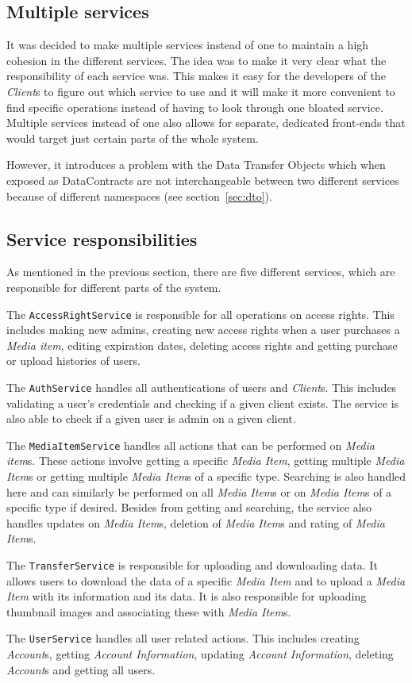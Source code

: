 \documentclass[../report.tex]{subfiles}
\begin{document}
\subsection{Multiple services}
It was decided to make multiple services instead of one to maintain a high cohesion in the different services.
The idea was to make it very clear what the responsibility of each service was. 
This makes it easy for the developers of the \textit{Client}s to figure out which service to use and it will make it more convenient to find specific operations instead of having to look through one bloated service.
Multiple services instead of one also allows for separate, dedicated front-ends that would target just certain parts of the whole system. 

However, it introduces a problem with the Data Transfer Objects which when exposed as DataContracts are not interchangeable between two different services because of different namespaces (see section~\ref{sec:dto}).

\subsection{Service responsibilities}
As mentioned in the previous section, there are five different services, which are responsible for different parts of the system. 

The \texttt{AccessRightService} is responsible for all operations on access rights. This includes making new admins, creating new access rights when a user purchases a \textit{Media item}, editing expiration dates, deleting access rights and getting purchase or upload histories of users. 

The \texttt{AuthService} handles all authentications of users and \textit{Client}s.
This includes validating a user's credentials and checking if a given client exists.
The service is also able to check if a given user is admin on a given client.

The \texttt{MediaItemService} handles all actions that can be performed on \textit{Media item}s. These actions involve getting a specific \textit{Media Item}, getting multiple \textit{Media Item}s or getting multiple \textit{Media Item}s of a specific type. Searching is also handled here and can similarly be performed on all \textit{Media Item}s or on \textit{Media Item}s of a specific type if desired. Besides from getting and searching, the service also handles updates on \textit{Media Item}s, deletion of \textit{Media Item}s and rating of \textit{Media Item}s.

The \texttt{TransferService} is responsible for uploading and downloading data. It allows users to download the data of a specific \textit{Media Item} and to upload a \textit{Media Item} with its information and its data. It is also responsible for uploading thumbnail images and associating these with \textit{Media Item}s.

The \texttt{UserService} handles all user related actions. This includes creating \textit{Account}s, getting \textit{Account Information}, updating \textit{Account Information}, deleting \textit{Account}s and getting all users. 
\end{document}
